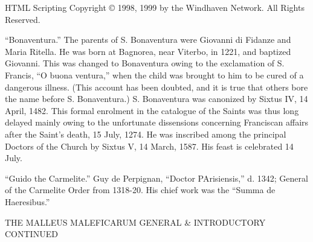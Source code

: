                             HTML Scripting Copyright © 1998, 1999 by the Windhaven Network.
                                                  All Rights Reserved.



           “Bonaventura.” The parents of S. Bonaventura were Giovanni di Fidanze and Maria
        Ritella. He was born at Bagnorea, near Viterbo, in 1221, and baptized Giovanni. This was
        changed to Bonaventura owing to the exclamation of S. Francis, “O buona ventura,” when
        the child was brought to him to be cured of a dangerous illness. (This account has been
        doubted, and it is true that others bore the name before S. Bonaventura.) S. Bonaventura
        was canonized by Sixtus IV, 14 April, 1482. This formal enrolment in the catalogue of the
        Saints was thus long delayed mainly owing to the unfortunate dissensions concerning
        Franciscan affairs after the Saint's death, 15 July, 1274. He was inscribed among the
        principal Doctors of the Church by Sixtus V, 14 March, 1587. His feast is celebrated 14
        July.



           “Guido the Carmelite.” Guy de Perpignan, “Doctor PArisiensis,” d. 1342; General of
        the Carmelite Order from 1318-20. His chief work was the “Summa de Haeresibus.”




                                  THE
                          MALLEUS MALEFICARUM
                                         GENERAL & INTRODUCTORY CONTINUED

